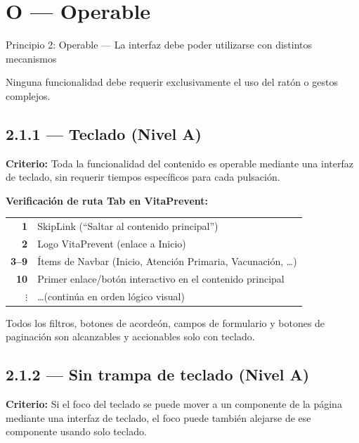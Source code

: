 \documentclass[12pt, a4paper]{article}
\begin{document}
\section{O --- Operable}

\begin{princbox}[successgreen]{Principio 2: Operable --- La interfaz debe poder utilizarse con distintos mecanismos}

Ninguna funcionalidad debe requerir exclusivamente el uso del ratón o gestos complejos.
\end{princbox}

\subsection{2.1.1 --- Teclado (Nivel A)}

\textbf{Criterio:} Toda la funcionalidad del contenido es operable mediante una interfaz de teclado, sin requerir tiempos específicos para cada pulsación.

\textbf{Verificación de ruta Tab en VitaPrevent:}

\begin{center}
\begin{tabular}{>{\bfseries\small}r l}
1 & SkipLink (``Saltar al contenido principal'') \\
2 & Logo VitaPrevent (enlace a Inicio) \\
3--9 & Ítems de Navbar (Inicio, Atención Primaria, Vacunación, \ldots) \\
10 & Primer enlace/botón interactivo en el contenido principal \\
$\vdots$ & \ldots (continúa en orden lógico visual) \\
\end{tabular}
\end{center}

Todos los filtros, botones de acordeón, campos de formulario y botones de paginación son alcanzables y accionables solo con teclado.

\subsection{2.1.2 --- Sin trampa de teclado (Nivel A)}

\textbf{Criterio:} Si el foco del teclado se puede mover a un componente de la página mediante una interfaz de teclado, el foco puede también alejarse de ese componente usando solo teclado.
\end{document}
